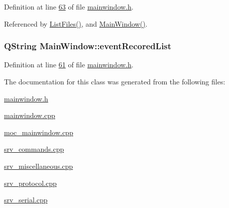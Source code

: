 Definition at line \hyperlink{a00039_source_l00063}{63} of file \hyperlink{a00039_source}{mainwindow.\+h}.



Referenced by \hyperlink{a00038_source_l00308}{List\+Files()}, and \hyperlink{a00038_source_l00024}{Main\+Window()}.

\hypertarget{a00006_a773de5ed6b1b522f94b0347ef556137d}{
\subsubsection[{event\+Recored\+List}]{\setlength{\rightskip}{0pt plus 5cm}Q\+String Main\+Window\+::event\+Recored\+List}}\label{a00006_a773de5ed6b1b522f94b0347ef556137d}


Definition at line \hyperlink{a00039_source_l00061}{61} of file \hyperlink{a00039_source}{mainwindow.\+h}.



The documentation for this class was generated from the following files\+:\begin{DoxyCompactItemize}
\item 
\hyperlink{a00039}{mainwindow.\+h}\item 
\hyperlink{a00038}{mainwindow.\+cpp}\item 
\hyperlink{a00015}{moc\+\_\+mainwindow.\+cpp}\item 
\hyperlink{a00047}{srv\+\_\+commands.\+cpp}\item 
\hyperlink{a00048}{srv\+\_\+miscellaneous.\+cpp}\item 
\hyperlink{a00049}{srv\+\_\+protocol.\+cpp}\item 
\hyperlink{a00050}{srv\+\_\+serial.\+cpp}\end{DoxyCompactItemize}
